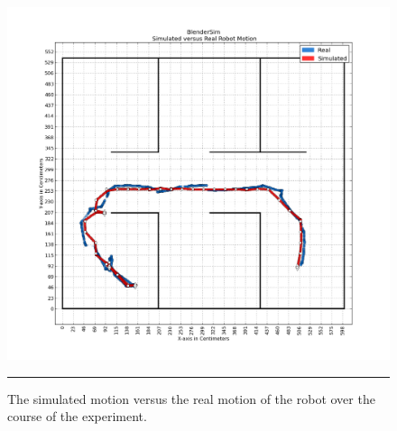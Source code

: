 \begin{figure}[htbp]
\centering
\includegraphics[width=6in]{../Figures/Chapter5/simulated_vs_real_w_physics.png}
\rule{35em}{0.5pt}
\caption[Simulated vs. Real Robot Motion]{The simulated motion versus the real motion of the robot over the course of the experiment.}
\label{fig:simulated_vs_real_w_physics}
\end{figure}
